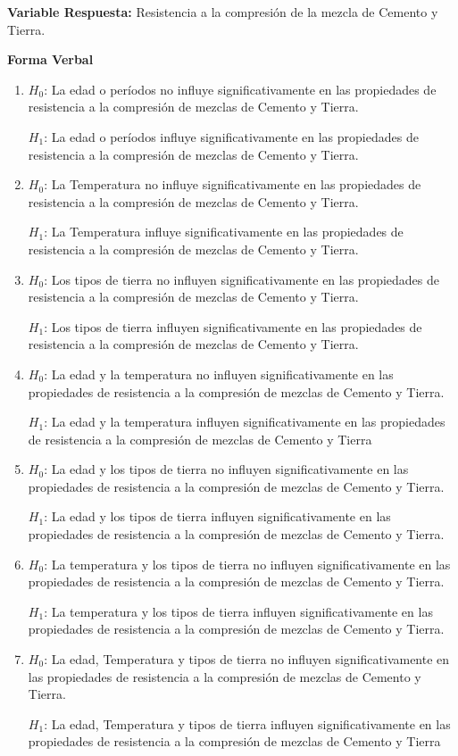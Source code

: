 \documentclass[12pt,letterpaper]{report}
\begin{document}
\textbf{Variable Respuesta:} Resistencia a la compresión de la mezcla de Cemento y Tierra.

\textbf{Forma Verbal}
\begin{enumerate}

\item $H_0$: La edad o períodos no influye significativamente en las propiedades de resistencia a la
compresión de mezclas de Cemento y Tierra.

      $H_1$: La edad o períodos influye significativamente en las propiedades de resistencia a la
compresión de mezclas de Cemento y Tierra.

\item $H_0$: La Temperatura no influye significativamente en las propiedades de resistencia a la
compresión de mezclas de Cemento y Tierra.

      $H_1$: La Temperatura influye significativamente en las propiedades de resistencia a la
compresión de mezclas de Cemento y Tierra.

\item $H_0$: Los tipos de tierra no influyen significativamente en las propiedades de resistencia a la
compresión de mezclas de Cemento y Tierra.

      $H_1$: Los tipos de tierra influyen significativamente en las propiedades de resistencia a la
compresión de mezclas de Cemento y Tierra.

\item $H_0$: La edad y la temperatura no influyen significativamente en las propiedades de
resistencia a la compresión de mezclas de Cemento y Tierra.

      $H_1$: La edad y la temperatura influyen significativamente en las propiedades de
resistencia a la compresión de mezclas de Cemento y Tierra

\item $H_0$: La edad y los tipos de tierra no influyen significativamente en las propiedades de
resistencia a la compresión de mezclas de Cemento y Tierra.

      $H_1$: La edad y los tipos de tierra influyen significativamente en las propiedades de
resistencia a la compresión de mezclas de Cemento y Tierra.

\item $H_0$: La temperatura y los tipos de tierra no influyen significativamente en las propiedades
de resistencia a la compresión de mezclas de Cemento y Tierra.

      $H_1$: La temperatura y los tipos de tierra influyen significativamente en las propiedades de
resistencia a la compresión de mezclas de Cemento y Tierra.

\item $H_0$: La edad, Temperatura y tipos de tierra no influyen significativamente en las
propiedades de resistencia a la compresión de mezclas de Cemento y Tierra.

      $H_1$: La edad, Temperatura y tipos de tierra influyen significativamente en las propiedades
de resistencia a la compresión de mezclas de Cemento y Tierra
\end{enumerate}
\end{document}
